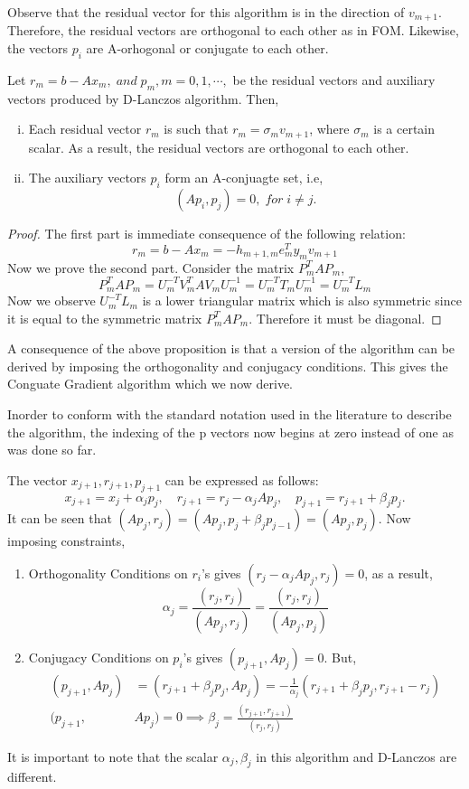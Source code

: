 \documentclass[10pt,a4paper]{article}
\begin{document}
Observe that the residual vector for this algorithm is in the direction of $v_{m+1}.$ Therefore, the residual vectors are orthogonal to each other as in FOM. Likewise, the vectors $p_i$ are A-orhogonal or conjugate to each other.

\begin{proposition}
Let $r_m=b-Ax_m,\;and\;p_m,m=0,1,\cdots,$ be the residual vectors and auxiliary vectors produced by D-Lanczos algorithm. Then,
\begin{enumerate}[i)]
\item Each residual vector $r_m$ is such that $r_m=\sigma_{m}v_{m+1}$, where $\sigma_m$ is a certain scalar. As a result, the residual vectors are orthogonal to each other.
\item The auxiliary vectors $p_i$ form an A-conjuagte set, i.e,
$$(Ap_i,p_j)=0,\;for\;i\neq j.$$
\end{enumerate}
\end{proposition}

\begin{proof}
The first part is immediate consequence of the following relation:
$$r_m=b-Ax_m=-h_{m+1,m}e^T_my_mv_{m+1}$$
Now we prove the second part. Consider the matrix $P^T_mAP_m$,
$$P^T_mAP_m = U^{-T}_mV^T_mAV_mU^{-1}_m = U^{-T}_mT_mU^{-1}_m = U^{-T}_mL_m$$
Now we observe $U^{-T}_mL_m$ is a lower triangular matrix which is also symmetric since it is equal to the symmetric matrix $P^T_mAP_m$. Therefore it must be diagonal.
\end{proof}

A consequence of the above proposition is that a version of the algorithm  can be derived by imposing the orthogonality and conjugacy conditions. This gives the Conguate Gradient algorithm which we now derive. 

\begin{remark}
Inorder to conform with the standard notation used in the literature to describe the algorithm, the indexing of the p vectors now begins at zero instead of one as was done so far.
\end{remark}

The vector $x_{j+1},r_{j+1},p_{j+1}$ can be expressed as follows:
$$x_{j+1}=x_j+\alpha_jp_j,\quad r_{j+1}=r_j-\alpha_jAp_j,\quad p_{j+1}=r_{j+1}+\beta_jp_j.$$
It can be seen that $(Ap_j,r_j)=(Ap_j,p_j+\beta_jp_{j-1})=(Ap_j,p_j).$ Now imposing constraints,
\begin{enumerate}
\item Orthogonality Conditions on $r_i$'s gives $(r_j-\alpha_jAp_j,r_j)=0$, as a result,
$$\alpha_j = \frac{(r_j,r_j)}{(Ap_j,r_j)}=\frac{(r_j,r_j)}{(Ap_j,p_j)}$$
\item Conjugacy Conditions on $p_i$'s gives $(p_{j+1},Ap_j)=0$. But,
\begin{align*}
(p_{j+1},Ap_j) &= (r_{j+1}+\beta_jp_j,Ap_j) = -\frac{1}{\alpha_j}(r_{j+1}+\beta_jp_j,r_{j+1}-r_j)\\ 
(p_{j+1},&Ap_j) = 0 \implies \beta_j=\frac{(r_{j+1},r_{j+1})}{(r_j,r_j)}
\end{align*}
\end{enumerate}
It is important to note that the scalar $\alpha_j,\beta_j$ in this algorithm and D-Lanczos are different.
\end{document}

